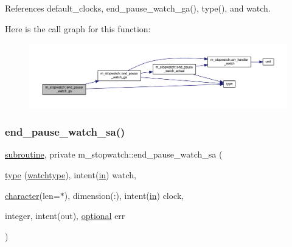 References default\+\_\+clocks, end\+\_\+pause\+\_\+watch\+\_\+ga(), type(), and watch.

Here is the call graph for this function\+:
\nopagebreak
\begin{figure}[H]
\begin{center}
\leavevmode
\includegraphics[width=350pt]{namespacem__stopwatch_a73243081be89522031b0767e9141663a_cgraph}
\end{center}
\end{figure}
\mbox{\label{namespacem__stopwatch_a4e478402d1066b90c1807d5fddb7e803}} 
\subsubsection{\texorpdfstring{end\+\_\+pause\+\_\+watch\+\_\+sa()}{end\_pause\_watch\_sa()}}
{\footnotesize\ttfamily \hyperlink{M__stopwatch_83_8txt_acfbcff50169d691ff02d4a123ed70482}{subroutine}, private m\+\_\+stopwatch\+::end\+\_\+pause\+\_\+watch\+\_\+sa (\begin{DoxyParamCaption}\item[{\hyperlink{stop__watch_83_8txt_a70f0ead91c32e25323c03265aa302c1c}{type} (\hyperlink{structm__stopwatch_1_1watchtype}{watchtype}), intent(\hyperlink{M__journal_83_8txt_afce72651d1eed785a2132bee863b2f38}{in})}]{watch,  }\item[{\hyperlink{option__stopwatch_83_8txt_abd4b21fbbd175834027b5224bfe97e66}{character}(len=$\ast$), dimension(\+:), intent(\hyperlink{M__journal_83_8txt_afce72651d1eed785a2132bee863b2f38}{in})}]{clock,  }\item[{integer, intent(out), \hyperlink{option__stopwatch_83_8txt_aa4ece75e7acf58a4843f70fe18c3ade5}{optional}}]{err }\end{DoxyParamCaption})\hspace{0.3cm}{\ttfamily [private]}}



